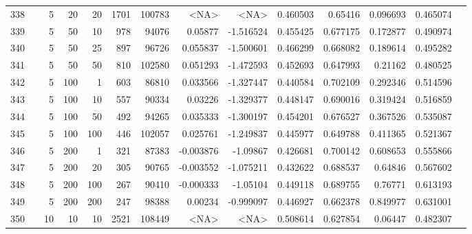 \begin{longtable}{llrrrrrrrrrrrr}
		338 & &            5 &                20 &           20 &           1701 &     100783 &      <NA> &      <NA> &  0.460503 &     0.65416 &       0.096693 &  0.465074 \\
		339 & &            5 &                50 &           10 &         978 &      94076 &   0.05877 & -1.516524 &  0.455425 &    0.677175 &       0.172877 &  0.490974 \\
		340 & &            5 &                50 &           25 &         897 &      96726 &  0.055837 & -1.500601 &  0.466299 &    0.668082 &       0.189614 &  0.495282 \\
		341 & &            5 &                50 &           50 &         810 &     102580 &  0.051293 & -1.472593 &  0.452693 &    0.647993 &        0.21162 &  0.480525 \\
		342 & &            5 &               100 &            1 &         603 &      86810 &  0.033566 & -1.327447 &  0.440584 &    0.702109 &       0.292346 &  0.514596 \\
		343 & &            5 &               100 &           10 &         557 &      90334 &   0.03226 & -1.329377 &  0.448147 &    0.690016 &       0.319424 &  0.516859 \\
		344 & &            5 &               100 &           50 &         492 &      94265 &  0.035333 & -1.300197 &  0.454201 &    0.676527 &       0.367526 &  0.535087 \\
		345 & &            5 &               100 &          100 &         446 &     102057 &  0.025761 & -1.249837 &  0.445977 &    0.649788 &       0.411365 &  0.521367 \\
		346 & &            5 &               200 &            1 &         321 &      87383 & -0.003876 &  -1.09867 &  0.426681 &    0.700142 &       0.608653 &  0.555866 \\
		347 & &            5 &               200 &           20 &         305 &      90765 & -0.003552 & -1.075211 &  0.432622 &    0.688537 &        0.64846 &  0.567602 \\
		348 & &            5 &               200 &          100 &         267 &      90410 & -0.000333 &  -1.05104 &  0.449118 &    0.689755 &        0.76771 &  0.613193 \\
		349 & &            5 &               200 &          200 &         247 &      98388 &   0.00234 & -0.999097 &  0.446927 &    0.662378 &       0.849977 &  0.631001 \\
		350 & &           10 &                10 &           10 &           2521 &     108449 &      <NA> &      <NA> &  0.508614 &    0.627854 &        0.06447 &  0.482307 \\

\end{longtable}
